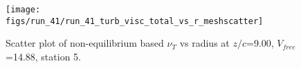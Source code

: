 \begin{figure}[H]
\centering
\texttt{[image: figs/run\_41/run\_41\_turb\_visc\_total\_vs\_r\_meshscatter]}
\caption{Scatter plot of non-equilibrium based $\nu_T$ vs radius at $z/c$=9.00, $V_{free}$=14.88, station 5.}
\label{fig:run_41_turb_visc_total_vs_r_meshscatter}
\end{figure}


